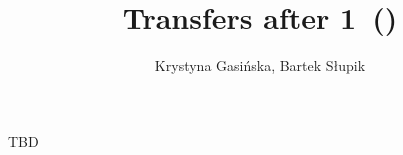 \documentclass[12pt, a4paper]{article}
\title{Transfers after 1\majs\ (\dbl)}
\author{Krystyna Gasińska, Bartek Słupik}
\begin{document}
\maketitle


TBD

\end{document}
